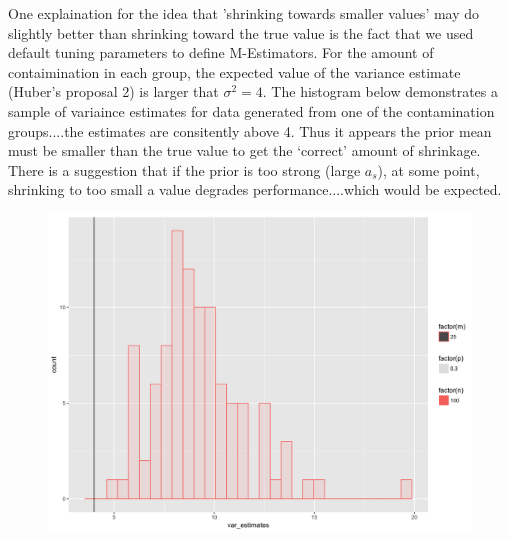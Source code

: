 \documentclass[12pt]{article}
\begin{document}
One explaination for the idea that 'shrinking towards smaller values' may do slightly better than shrinking toward the true value is the fact that we used default tuning parameters to define M-Estimators. For the amount of contaimination in each group, the expected value of the variance estimate (Huber's proposal 2) is larger that $\sigma^{2} = 4$. The histogram below demonstrates a sample of variaince estimates for data generated from one of the contamination groups....the estimates are consitently above 4. Thus it appears the prior mean must be smaller than the true value to get the `correct' amount of shrinkage. There is a suggestion that if the prior is too strong (large $a_{s}$), at some point, shrinking to too small a value degrades performance....which would be expected. 

\begin{figure}[H]
\centering
\includegraphics[scale = .3]{hist_sig2_ests.png}
\end{figure}







%
%
\end{document}
